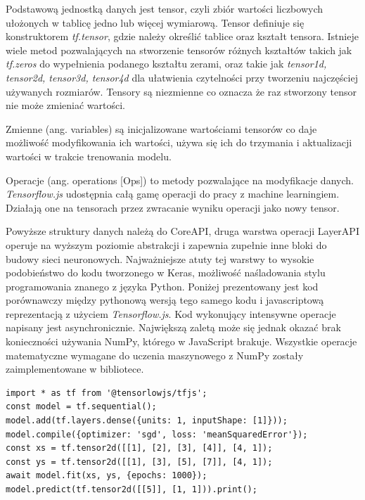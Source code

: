 \documentclass[12pt,a4paper,twoside,titlepage,openright]{book}
\begin{document}
Podstawową jednostką danych jest tensor, czyli zbiór wartości liczbowych ułożonych w tablicę jedno lub więcej wymiarową. Tensor definiuje się konstruktorem \textit{tf.tensor}, gdzie należy określić tablice oraz kształt tensora. Istnieje wiele metod pozwalających na stworzenie tensorów różnych kształtów takich jak \textit{tf.zeros} do wypełnienia podanego kształtu zerami, oraz takie jak \textit{tensor1d, tensor2d, tensor3d, tensor4d} dla ułatwienia czytelności przy tworzeniu najczęściej używanych rozmiarów.
Tensory są niezmienne co oznacza że raz stworzony tensor nie może zmieniać wartości. 

Zmienne (ang. variables) są inicjalizowane wartościami tensorów co daje możliwość modyfikowania ich wartości, używa się ich do trzymania i aktualizacji wartości w trakcie trenowania modelu.

Operacje (ang. operations [Ops]) to metody pozwalające na modyfikacje danych. \textit{Tensorflow.js} udostępnia całą gamę operacji do pracy z machine learningiem. Działają one na tensorach przez zwracanie wyniku operacji jako nowy tensor.

Powyższe struktury danych należą do CoreAPI, druga warstwa operacji LayerAPI operuje na wyższym poziomie abstrakcji i zapewnia zupełnie inne bloki do budowy sieci neuronowych. Najważniejsze atuty tej warstwy to wysokie podobieństwo do kodu tworzonego w Keras, możliwość naśladowania stylu programowania znanego z języka Python. Poniżej prezentowany jest kod porównawczy między pythonową wersją tego samego kodu i javascriptową reprezentacją z użyciem \textit{Tensorflow.js}. Kod wykonujący intensywne operacje napisany jest asynchronicznie. Największą zaletą może się jednak okazać brak konieczności używania NumPy, którego w JavaScript brakuje. Wszystkie operacje matematyczne wymagane do uczenia maszynowego z NumPy zostały zaimplementowane w bibliotece.\cite{siteTensorflowJSConcepts}

\noindent
\begin{minipage}{\linewidth}
\begin{lstlisting}[caption=Proste operacje w JavaScript z Tensorflow.js, label=lst:test]
import * as tf from '@tensorlowjs/tfjs';
const model = tf.sequential();
model.add(tf.layers.dense({units: 1, inputShape: [1]}));
model.compile({optimizer: 'sgd', loss: 'meanSquaredError'});
const xs = tf.tensor2d([[1], [2], [3], [4]], [4, 1]);
const ys = tf.tensor2d([[1], [3], [5], [7]], [4, 1]);
await model.fit(xs, ys, {epochs: 1000});
model.predict(tf.tensor2d([[5]], [1, 1])).print();
\end{lstlisting}
\end{minipage}
\end{document}
